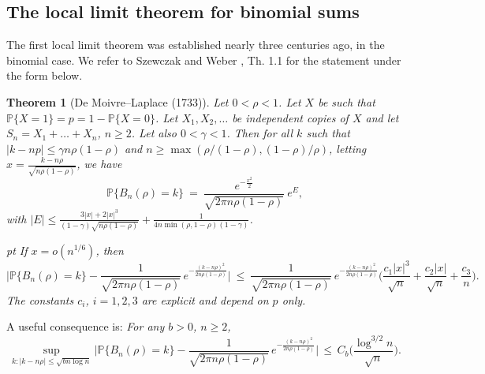 \documentclass[11pt,draft,reqno]{amsart}
\newtheorem{theorem}{Theorem}[section]
\theoremstyle{definition}
\theoremstyle{remarks}
\numberwithin{equation}{section}
\def \g{{\gamma}}
\def\beq{\begin{equation}}
\def\eeq{\end{equation}}
\begin{document}
\subsection{The local limit theorem for binomial sums}
The first local limit theorem    was  established  nearly  three centuries ago, in the binomial case. We refer to     Szewczak    and  Weber \cite{SW}, Th. 1.1 for the statement   under the  form below. 
 \begin{theorem}[{\rm De Moivre--Laplace} (1733)]
\label{moivre}  Let
$0<\rho<1$. Let $X$ be such that
${\mathbb P}\{X=1\}=p=1-{\mathbb P}\{X=0\}
$. Let
$X_1, X_2,\ldots$ be independent copies of
$X$ and let $S_n=X_1+\ldots +X_n$, $n\ge 2$. Let also  $0<\g<1$.
Then for all $k$ such that $|k-np|  \le \g n\rho(1-\rho)$ and $    n \ge \max(\rho/(1-\rho),(1-\rho)/\rho)$, letting
$ x= \frac{k-n\rho}{\sqrt{  n\rho(1-\rho)}}$,
we have
 \begin{equation*} {\mathbb P}\{B_n(\rho)=k\}  \ =\
 \frac{e^{-  \frac{x^2}{  2  } }}{\sqrt{2\pi n\rho(1-\rho)}} \   e^E ,
 \end{equation*}
with
$|E|\le   \frac{3|x|+ 2 |x|^3}{(1-\g)\sqrt{ n\rho(1-\rho)}} +  \frac{1}{ 4n\min(\rho,1-\rho )(1 -  \g      )}$.

 pt  If $x= o(n^{1/6})$,  then
\begin{equation*}\Big| {\mathbb P}\{B_n(\rho)=k\}- \frac{1 }{\sqrt{2\pi n\rho(1-\rho)}}\,  e^{-  \frac{(k-n\rho)^2}{  2 n\rho(1-\rho) }}\Big|
\ \le  \   \frac{1 }{\sqrt{2\pi n\rho(1-\rho)}}\ e^{-  \frac{(k-n\rho)^2}{  2 n\rho(1-\rho) }}\Big( \frac{c_1 |x|^3}{\sqrt{ n}}+ \frac{c_2|x|}{\sqrt n} +  \frac{c_3}{ n}\Big).
\end{equation*}
The constants $c_i$, $i=1,2,3$ are explicit and depend on $p$ only. \end{theorem}

A useful  consequence is: {\it For any $b>0$, $n\ge 2$,}
\beq\label{binomial.llt.1}
  \sup_{k:|k-n\rho|\le \sqrt{b n\log n}}\Big|{\mathbb P}\{B_n(\rho)=k\}- \frac{1 }{\sqrt{2\pi n\rho(1-\rho)}}\,  e^{-  \frac{(k-n\rho)^2}{  2 n\rho(1-\rho) }}\Big|
\, \le  \,  C_b \Big( \frac{ \log^{3/2} n}{\sqrt n}\Big).  
\eeq 
\end{document}
